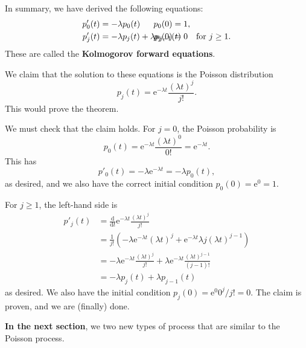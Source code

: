 \documentclass[
  a4paper,
]{article}
\theoremstyle{definition}
\theoremstyle{definition}
\theoremstyle{definition}
\theoremstyle{remark}
\begin{document}
In summary, we have derived the following equations:
\begin{align*}
   p'_0(t) &= -\lambda p_0(t) & \hspace{-1.5cm} p_0(0) & = 1 ,\\
   p'_j(t) &= -\lambda p_j(t) + \lambda p_{j-1}(t) & \hspace{-1.5cm} p_j(0) &= 0 \quad \text{for $j \geq 1$} .
\end{align*}
These are called the \textbf{Kolmogorov forward equations}.

We claim that the solution to these equations is the Poisson distribution
\[ p_j(t) = \mathrm{e}^{-\lambda t} \frac{(\lambda t)^j}{j!} . \]
This would prove the theorem.

We must check that the claim holds. For \(j = 0\), the Poisson probability is
\[ p_0(t) = \mathrm{e}^{-\lambda t} \frac{(\lambda t)^0}{0!} = \mathrm{e}^{-\lambda t} . \]
This has
\[ p'_0(t) = -\lambda \mathrm{e}^{-\lambda t} = -\lambda p_0(t) , \]
as desired, and we also have the correct initial condition \(p_0(0) = \mathrm{e}^{0} = 1\).

For \(j \geq 1\), the left-hand side is
\begin{align*}
p'_j(t) &= \frac{\mathrm d}{\mathrm d t} \mathrm{e}^{-\lambda t} \frac{(\lambda t)^j}{j!} \\
& = \frac{1}{j!} \left(-\lambda \mathrm{e}^{-\lambda t}(\lambda t)^j + \mathrm{e}^{-\lambda t} \lambda j(\lambda t)^{j-1} \right) \\
&= - \lambda \mathrm{e}^{-\lambda t} \frac{(\lambda t)^j}{j!} + \lambda \mathrm{e}^{-\lambda t} \frac{(\lambda t)^{j-1}}{(j-1)!} \\
&= -\lambda p_j(t) + \lambda p_{j-1}(t)
\end{align*}
as desired. We also have the initial condition \(p_j(0) = \mathrm{e}^{0} 0^j/j! = 0\).
The claim is proven, and we are (finally) done.

\textbf{In the next section}, we two new types of process that are similar to the Poisson process.
\end{document}
